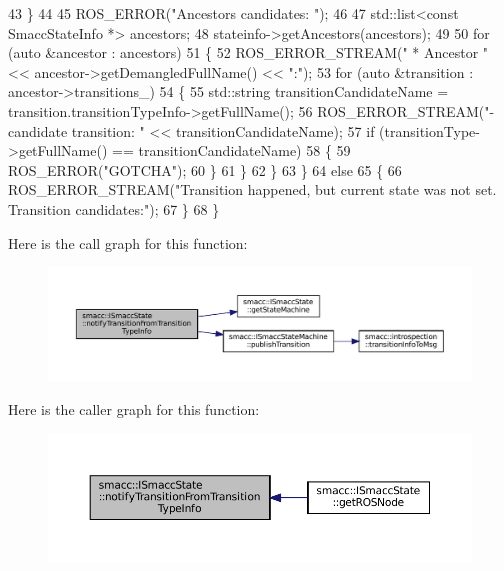 \begin{DoxyCode}
43         \}
44 
45         ROS\_ERROR(\textcolor{stringliteral}{"Ancestors candidates: "});
46 
47         std::list<const SmaccStateInfo *> ancestors;
48         stateinfo->getAncestors(ancestors);
49 
50         \textcolor{keywordflow}{for} (\textcolor{keyword}{auto} &ancestor : ancestors)
51         \{
52             ROS\_ERROR\_STREAM(\textcolor{stringliteral}{" * Ancestor "} << ancestor->getDemangledFullName() << \textcolor{stringliteral}{":"});
53             \textcolor{keywordflow}{for} (\textcolor{keyword}{auto} &transition : ancestor->transitions\_)
54             \{
55                 std::string transitionCandidateName = transition.transitionTypeInfo->getFullName();
56                 ROS\_ERROR\_STREAM(\textcolor{stringliteral}{"- candidate transition: "} << transitionCandidateName);
57                 \textcolor{keywordflow}{if} (transitionType->getFullName() == transitionCandidateName)
58                 \{
59                     ROS\_ERROR(\textcolor{stringliteral}{"GOTCHA"});
60                 \}
61             \}
62         \}
63     \}
64     \textcolor{keywordflow}{else}
65     \{
66         ROS\_ERROR\_STREAM(\textcolor{stringliteral}{"Transition happened, but current state was not set. Transition candidates:"});
67     \}
68 \}
\end{DoxyCode}
Here is the call graph for this function\+:
\nopagebreak
\begin{figure}[H]
\begin{center}
\leavevmode
\includegraphics[width=350pt]{classsmacc_1_1ISmaccState_acb3dd7d402c634004ae3b67a01169438_cgraph}
\end{center}
\end{figure}
Here is the caller graph for this function\+:
\nopagebreak
\begin{figure}[H]
\begin{center}
\leavevmode
\includegraphics[width=350pt]{classsmacc_1_1ISmaccState_acb3dd7d402c634004ae3b67a01169438_icgraph}
\end{center}
\end{figure}
\mbox{\label{classsmacc_1_1ISmaccState_a4f2ff8e3eda8aa9bbb60c8ff17d0def1}} 
